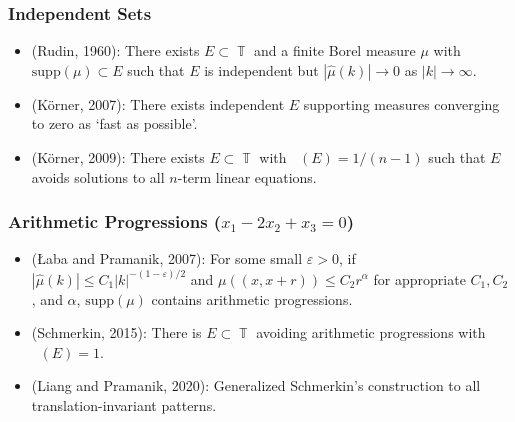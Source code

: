 \documentclass[handout,usenames,dvipsnames]{beamer}
\DeclareMathOperator{\TT}{\mathbb{T}}
\DeclareMathOperator{\fordim}{\text{dim}_{\mathbb{F}}}
\begin{document}
\begin{frame}
    \frametitle{Independent Sets}

    \begin{itemize}
        \item (Rudin, 1960): There exists $E \subset \TT$ and a finite Borel measure $\mu$ with $\text{supp}(\mu) \subset E$ such that $E$ is independent but $|\widehat{\mu}(k)| \to 0$ as $|k| \to \infty$.

        \pause
        \item (K\"{o}rner, 2007): There exists independent $E$ supporting measures converging to zero as `fast as possible'.

        \pause
        \item (K\"{o}rner, 2009): There exists $E \subset \TT$ with $\fordim(E) = 1/(n-1)$ such that $E$ avoids solutions to all $n$-term linear equations.
    \end{itemize}
\end{frame}


\begin{frame}
    \frametitle{Arithmetic Progressions ($x_1 - 2x_2 + x_3 = 0$)}

    \begin{itemize}
        \pause
        \item (Łaba and Pramanik, 2007): For some small $\varepsilon > 0$, if $|\widehat{\mu}(k)| \leq C_1 |k|^{-(1-\varepsilon)/2}$ and $\mu((x,x+r)) \leq C_2 r^\alpha$ for appropriate $C_1,C_2$, and $\alpha$, $\text{supp}(\mu)$ contains arithmetic progressions.

        \pause
        \item (Schmerkin, 2015): There is $E \subset \TT$ avoiding arithmetic progressions with $\fordim(E) = 1$.

        \pause
        \item (Liang and Pramanik, 2020): Generalized Schmerkin's construction to all translation-invariant patterns.
    \end{itemize}
\end{frame}
\end{document}
